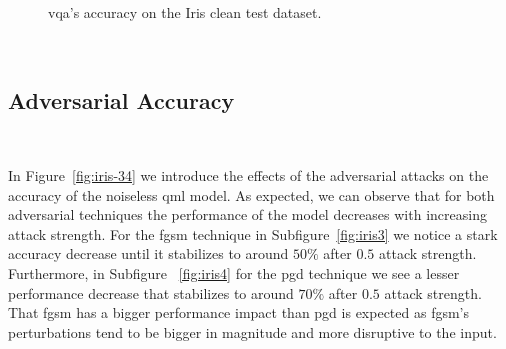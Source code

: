 \begin{figure}[!h]
  \caption{\ac{vqa}'s accuracy on the Iris clean test dataset.}
  \label{fig:iris-12}
\end{figure} \

\subsection{Adversarial Accuracy}\label{subsection:iris-adv-acc} \

In Figure~\ref{fig:iris-34} we introduce the effects of the
adversarial attacks on the accuracy of the noiseless \ac{qml}
model. As expected, we can observe that for both adversarial
techniques the performance of the model decreases with increasing
attack strength. For the \ac{fgsm} technique in Subfigure~\ref{fig:iris3}
we notice a stark accuracy decrease until it stabilizes to around
\(50\%\) after \(0.5\) attack strength. Furthermore, in Subfigure
~\ref{fig:iris4} for the \ac{pgd} technique we see a lesser performance
decrease that stabilizes to around \(70\%\) after \(0.5\) attack strength. 
That \ac{fgsm} has a bigger performance impact than \ac{pgd} is expected
as \ac{fgsm}'s perturbations tend to be bigger in magnitude and more
disruptive to the input. \

